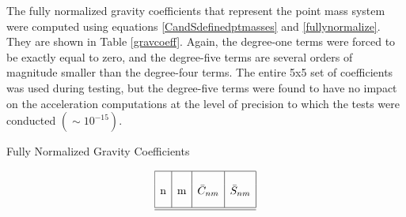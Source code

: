 \begin{description}
The fully normalized gravity coefficients that represent the point mass system
were computed using equations \ref{CandSdefinedptmasses} and
\ref{fullynormalize}. They are shown in Table \ref{gravcoeff}.  Again, the
degree-one terms were forced to be exactly equal to zero, and the degree-five
terms are several orders of magnitude smaller than the degree-four terms. The
entire 5x5 set of coefficients was used during testing, but the degree-five
terms were found to have no impact on the acceleration computations at the level
of precision to which the tests were conducted $(\sim 10^{-15})$.
\begin{table}\caption{Fully Normalized Gravity Coefficients} \label{gravcoeff}
\smallskip
\[ \begin{array}{| c | c | c | c |}\hline
\mbox{ } & \mbox{ } & \mbox{ } & \mbox{ }\\
\mbox{n} & \mbox{m} & \mbox{$\bar{C}_{nm}$} & \mbox{$\bar{S}_{nm}$}
\\*[0.3cm]\hline \hline


\end{array}\]
\end{table}
\end{description}
